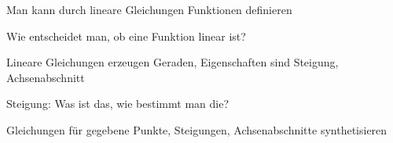 \documentclass[../../main.tex]{subfiles}
\begin{document}
Man kann durch lineare Gleichungen Funktionen definieren

Wie entscheidet man, ob eine Funktion linear ist?

Lineare Gleichungen erzeugen Geraden, Eigenschaften sind Steigung, Achsenabschnitt

Steigung: Was ist das, wie bestimmt man die?

Gleichungen für gegebene Punkte, Steigungen, Achsenabschnitte synthetisieren
\end{document}
